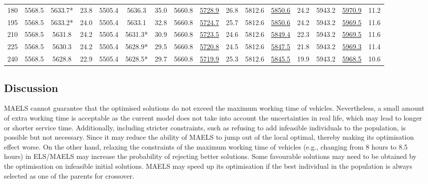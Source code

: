 \documentclass[journal]{IEEEtran}
\begin{document}
\begin{table}[htbp]
\begin{tabular}{|c|ccc|ccc|ccc|ccc|ccc|}
		180 & 5568.5 & 5633.7* & 23.8 & 5505.4 & 5636.3 & 35.0 & 5660.8 & \underline{5728.9} & 26.8 & 5812.6 & \underline{5850.6} & 24.2 & 5943.2 & \underline{5970.9} & 11.2 \\
		195 & 5568.5 & 5633.2* & 24.0 & 5505.4 & 5633.1 & 32.8 & 5660.8 & \underline{5724.7} & 25.7 & 5812.6 & \underline{5850.6} & 24.2 & 5943.2 & \underline{5969.5} & 11.6 \\
		210 & 5568.5 & 5631.8 & 24.2 & 5505.4 & 5631.3* & 30.9 & 5660.8 & \underline{5723.5} & 24.6 & 5812.6 & \underline{5849.4} & 22.3 & 5943.2 & \underline{5969.5} & 11.6 \\
		225 & 5568.5 & 5630.3 & 24.2 & 5505.4 & 5628.9* & 29.5 & 5660.8 & \underline{5720.8} & 24.5 & 5812.6 & \underline{5847.5} & 21.8 & 5943.2 & \underline{5969.3} & 11.4 \\
		240 & 5568.5 & 5628.8 & 22.9 & 5505.4 & 5628.5* & 29.7 & 5660.8 & \underline{5719.9} & 25.3 & 5812.6 & \underline{5845.5} & 19.9 & 5943.2 & \underline{5968.5} & 10.6 \\
		\hline
	\end{tabular}
\end{table}


\subsection{Discussion}\label{sec:om_disscussion}
MAELS cannot guarantee that the optimised solutions do not exceed the maximum working time of vehicles. Nevertheless, a small amount of extra working time is acceptable as the current model does not take into account the uncertainties in real life, which may lead to longer or shorter service time. Additionally, including stricter constraints, such as refusing to add infeasible individuals to the population, is possible but not necessary. Since it may reduce the ability of MAELS to jump out of the local optimal, thereby making its optimisation effect worse. On the other hand, relaxing the constraints of the maximum working time of vehicles (e.g., changing from 8 hours to 8.5 hours) in ELS/MAELS may increase the probability of rejecting better solutions. Some favourable solutions may need to be obtained by the optimisation on infeasible initial solutions. MAELS may speed up its optimisation if the best individual in the population is always selected as one of the parents for crossover.
\end{document}

